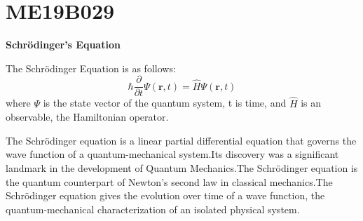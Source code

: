 \section{ME19B029}
\centerline{\textbf{Schr\"{o}dinger's Equation}}
The Schr\"{o}dinger Equation is as follows:
\begin{equation}
\hbar \frac{\partial}{\partial t}\Psi(\mathbf{r},t) = \hat H \Psi(\mathbf{r},t)
\end{equation}
where  $\Psi$  is the state vector of the quantum system, t is time, and $\hat {H}$ is an observable, the Hamiltonian operator.


The Schrödinger equation is a linear partial differential equation that governs the wave function of a quantum-mechanical system.Its discovery was a significant landmark in the development of Quantum Mechanics.The Schrödinger equation is the quantum counterpart of Newton's second law in classical mechanics.The Schrödinger equation gives the evolution over time of a wave function, the quantum-mechanical characterization of an isolated physical system.

